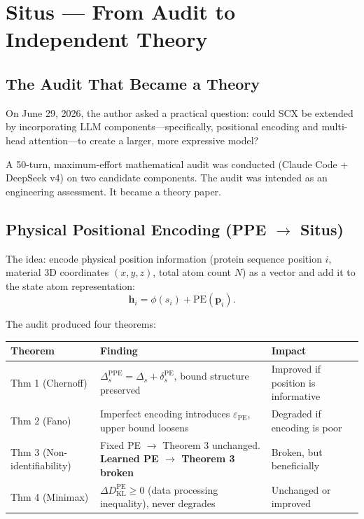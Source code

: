 \documentclass[12pt,a4paper]{ctexart}
\begin{document}
\section{Situs — From Audit to Independent Theory}

\subsection{The Audit That Became a Theory}

On June 29, 2026, the author asked a practical question: could SCX be extended by incorporating LLM components—specifically, positional encoding and multi-head attention—to create a larger, more expressive model?

A 50-turn, maximum-effort mathematical audit was conducted (Claude Code + DeepSeek v4) on two candidate components. The audit was intended as an engineering assessment. It became a theory paper.

\subsection{Physical Positional Encoding (PPE $\to$ Situs)}

The idea: encode physical position information (protein sequence position $i$, material 3D coordinates $(x,y,z)$, total atom count $N$) as a vector and add it to the state atom representation:
\[
\mathbf{h}_i = \phi(s_i) + \text{PE}(\mathbf{p}_i).
\]

The audit produced four theorems:

\begin{table}[htbp]
\centering
\begin{tabular}{@{}lll@{}}
\toprule
Theorem & Finding & Impact \\
\midrule
Thm 1 (Chernoff) & $\Delta_s^{\text{PPE}} = \Delta_s + \delta_s^{\text{PE}}$, bound structure preserved & Improved if position is informative \\
Thm 2 (Fano) & Imperfect encoding introduces $\varepsilon_{\text{PE}}$, upper bound loosens & Degraded if encoding is poor \\
Thm 3 (Non-identifiability) & Fixed PE $\to$ Theorem 3 unchanged. \textbf{Learned PE $\to$ Theorem 3 broken} & Broken, but beneficially \\
Thm 4 (Minimax) & $\Delta D_{\text{KL}}^{\text{PE}} \geq 0$ (data processing inequality), never degrades & Unchanged or improved \\
\bottomrule
\end{tabular}
\end{table}
\end{document}

